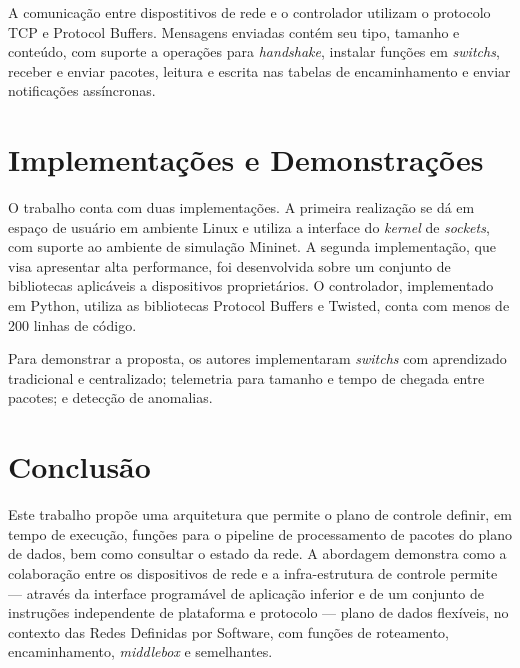 A comunicação entre dispostitivos de rede e o controlador utilizam o protocolo TCP e Protocol Buffers. Mensagens enviadas contém seu tipo, tamanho e conteúdo, com suporte a operações para \textit{handshake}, instalar funções em \textit{switchs}, receber e enviar pacotes, leitura e escrita nas tabelas de encaminhamento e enviar notificações assíncronas.


\section*{Implementações e Demonstrações}

O trabalho conta com duas implementações. A primeira realização se dá em espaço de usuário em ambiente Linux e utiliza a interface do \textit{kernel} de \textit{sockets}, com suporte ao ambiente de simulação Mininet. A segunda implementação, que visa apresentar alta performance, foi desenvolvida sobre um conjunto de bibliotecas aplicáveis a dispositivos proprietários. O controlador, implementado em Python, utiliza as bibliotecas Protocol Buffers e Twisted, conta com menos de 200 linhas de código.

Para demonstrar a proposta, os autores implementaram \textit{switchs} com aprendizado tradicional e centralizado; telemetria para tamanho e tempo de chegada entre pacotes; e detecção de anomalias.


\section*{Conclusão}

Este trabalho propõe uma arquitetura que permite o plano de controle definir, em tempo de execução, funções para o pipeline de processamento de pacotes do plano de dados, bem como consultar o estado da rede. A abordagem demonstra como a colaboração entre os dispositivos de rede e a infra-estrutura de controle permite --- através da interface programável de aplicação inferior e de um conjunto de instruções independente de plataforma e protocolo --- plano de dados flexíveis, no contexto das Redes Definidas por Software, com funções de roteamento, encaminhamento, \textit{middlebox} e semelhantes.
